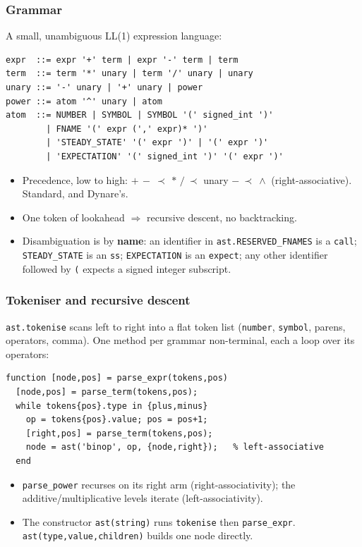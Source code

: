 \documentclass[10pt,slidestop]{beamer}
\newcommand{\code}[1]{\texttt{#1}}
\begin{document}
\begin{frame}[fragile]\frametitle{Grammar}
  A small, unambiguous LL(1) expression language:

\begin{lstlisting}[language={},basicstyle=\scriptsize\ttfamily]
expr  ::= expr '+' term | expr '-' term | term
term  ::= term '*' unary | term '/' unary | unary
unary ::= '-' unary | '+' unary | power
power ::= atom '^' unary | atom
atom  ::= NUMBER | SYMBOL | SYMBOL '(' signed_int ')'
        | FNAME '(' expr (',' expr)* ')'
        | 'STEADY_STATE' '(' expr ')' | '(' expr ')'
        | 'EXPECTATION' '(' signed_int ')' '(' expr ')'
\end{lstlisting}

  \begin{itemize}
  \item Precedence, low to high: $+\,-\ \prec\ *\,/\ \prec$ unary $-\ \prec\ \wedge$
    (right-associative). Standard, and Dynare's.\newline
  \item One token of lookahead $\Rightarrow$ recursive descent, no backtracking.\newline
  \item Disambiguation is by \textbf{name}: an identifier in
    \code{ast.RESERVED\_FNAMES} is a \code{call}; \code{STEADY\_STATE} is an
    \code{ss}; \code{EXPECTATION} is an \code{expect}; any other identifier followed
    by \code{(} expects a signed integer subscript.
  \end{itemize}
\end{frame}

\begin{frame}[fragile]\frametitle{Tokeniser and recursive descent}
  \code{ast.tokenise} scans left to right into a flat token list
  (\code{number}, \code{symbol}, parens, operators, comma). One method per
  grammar non-terminal, each a loop over its operators:

\begin{lstlisting}[language={},basicstyle=\scriptsize\ttfamily]
function [node,pos] = parse_expr(tokens,pos)
  [node,pos] = parse_term(tokens,pos);
  while tokens{pos}.type in {plus,minus}
    op = tokens{pos}.value; pos = pos+1;
    [right,pos] = parse_term(tokens,pos);
    node = ast('binop', op, {node,right});   % left-associative
  end
\end{lstlisting}

  \begin{itemize}
  \item \code{parse\_power} recurses on its right arm (right-associativity);
    the additive/multiplicative levels iterate (left-associativity).\newline
  \item The constructor \code{ast(string)} runs \code{tokenise} then
    \code{parse\_expr}. \code{ast(type,value,children)} builds one node directly.
  \end{itemize}
\end{frame}
\end{document}
